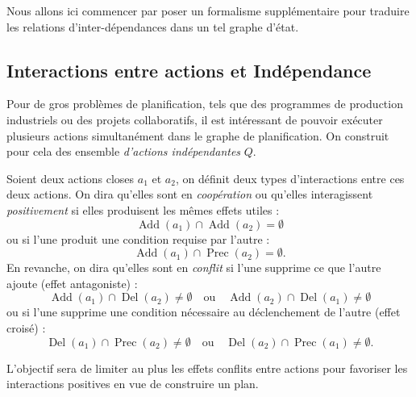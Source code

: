 Nous allons ici commencer par poser un formalisme supplémentaire pour traduire les relations d'inter-dépendances dans un tel graphe d'état. 

\subsection{Interactions entre actions et Indépendance}

Pour de gros problèmes de planification, tels que des programmes de production industriels ou des projets collaboratifs, il est intéressant de pouvoir exécuter plusieurs actions simultanément dans le graphe de planification. On construit pour cela des ensemble \emph{d'actions indépendantes} $ Q$. 

\begin{definition}
    Soient deux actions closes $a_1$ et $a_2$, on définit deux types d'interactions entre ces deux actions. On dira qu'elles sont en \emph{coopération} ou qu'elles interagissent \emph{positivement} si elles produisent les mêmes effets utiles : 
    \begin{equation}
        \operatorname{Add}(a_1) \cap \operatorname{Add}(a_2) = \emptyset
    \end{equation}
    ou si l'une produit une condition requise par l'autre : 
    \begin{equation}
        \operatorname{Add}(a_1) \cap \operatorname{Prec}(a_2) = \emptyset. 
    \end{equation}
    En revanche, on dira qu'elles sont en \emph{conflit} si l'une supprime ce que l'autre ajoute (effet antagoniste) : 
    \begin{equation}
        \operatorname{Add}(a_1) \cap \operatorname{Del}(a_2) \not = \emptyset 
        \quad \text{ou} \quad 
        \operatorname{Add}(a_2) \cap \operatorname{Del}(a_1) \not = \emptyset 
    \end{equation}
    ou si l'une supprime une condition nécessaire au déclenchement de l'autre (effet croisé) :
    \begin{equation}
        \operatorname{Del}(a_1) \cap \operatorname{Prec}(a_2) \not = \emptyset 
        \quad \text{ou} \quad 
        \operatorname{Del}(a_2) \cap \operatorname{Prec}(a_1) \not = \emptyset. 
    \end{equation}
\end{definition}

L'objectif sera de limiter au plus les effets conflits entre actions pour favoriser les interactions positives en vue de construire un plan. 

